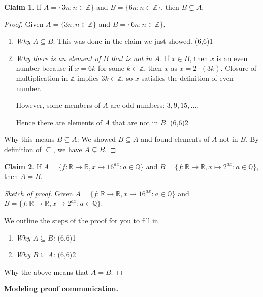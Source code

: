 \documentclass[11pt]{article}
\newenvironment{bignote}[1][Instructor note]%
	{\begin{mdframed}\raggedright{\bf #1.~}}
	{\end{mdframed}}
\newcommand{\R}{\mathbb{R}}
\newcommand{\Q}{\mathbb{Q}}
\newcommand{\Z}{\mathbb{Z}}
\renewcommand\subset\subseteq
\newcommand\st{:}
\theoremstyle{definition}
\newtheorem*{claim*}{Claim}
\newcommand\qedpart[1]{ \hfill \framebox(6,6){\tiny #1}}
\begin{document}
\begin{claim*}
If $A=\{ 3n \st n \in \Z\}$ and $B=\{ 6n \st n\in \Z\}$, then $B\subsetneq A$.
\end{claim*}
\begin{proof}
Given $A=\{ 3n \st n \in \Z\}$ and $B=\{ 6n \st n\in \Z\}$. 

\begin{enumerate}
\item {\it Why $A\subset B$}: This was done in the claim we just showed. \qedpart{1}

\item {\it Why there is an element of $B$ that is not in $A$.}
If $x\in B$, then $x$ is an even number because if $x=6k$ for some $k\in\Z$, then $x$ as $x=2\cdot (3k)$. Closure of multiplication in $\Z$ implies $3k\in \Z$, so $x$ satisfies the definition of even number. 

However, some members of $A$ are odd numbers: $3, 9, 15, \dots $. 

Hence there are elements of $A$ that are not in $B$. \qedpart{2}

\end{enumerate}
Why this means $B\subsetneq A$: We showed $B\subset A$ and found elements of $A$ not in $B$. By definition of $\subseteq$, we have $A\subsetneq B$.
\end{proof}


\begin{claim*}
If $A=\{f:\R\to \R, x\mapsto 16^{ax} \st a\in \Q\}$ and $B=\{f:\R\to \R, x\mapsto 2^{ax} \st a\in \Q\}$, then $A=B$.
\end{claim*}
\begin{proof}[Sketch of proof] 
Given $A=\{f:\R\to \R, x\mapsto 16^{ax} \st a\in \Q\}$ and $B=\{f:\R\to \R, x\mapsto 2^{ax} \st a\in \Q\}$.

We outline the steps of the proof for you to fill in.

\begin{enumerate}
\item {\it Why $A\subset B$:} \qedpart{1}


\item {\it Why $B\subset A$:} \qedpart{2}
\end{enumerate}

Why the above means that $A=B$:
\end{proof}

\begin{bignote}[Modeling proof communication]

\vspace*{2in}
\end{bignote} 
\end{document}
